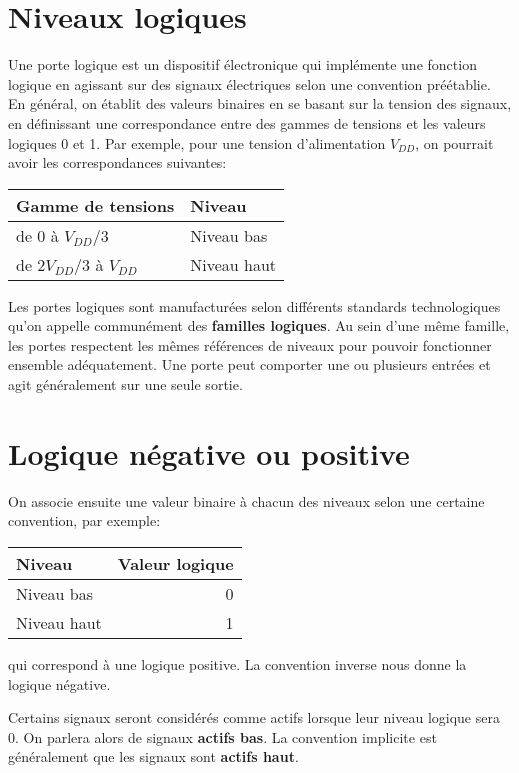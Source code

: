 \documentclass[letter, oneside]{book}
\begin{document}
\section{Niveaux logiques}
\label{sec:org345abae}

Une porte logique est un dispositif électronique qui implémente une
fonction logique en agissant sur des signaux électriques selon une
convention préétablie. En général, on établit des valeurs binaires en
se basant sur la tension des signaux, en définissant une
correspondance entre des gammes de tensions et les valeurs logiques 0
et 1. Par exemple, pour une tension d'alimentation \(V_{DD}\), on
pourrait avoir les correspondances suivantes:

\begin{center}
\begin{tabular}{ll}
Gamme de tensions & Niveau\\[0pt]
\hline
de 0 à  \(V_{DD}/3\) & Niveau bas\\[0pt]
de \(2V_{DD}/3\) à  \(V_{DD}\) & Niveau haut\\[0pt]
\end{tabular}
\end{center}

Les portes logiques sont manufacturées selon différents standards
technologiques qu'on appelle communément des \textbf{familles logiques}. Au
sein d'une même famille, les portes respectent les mêmes références de
niveaux pour pouvoir fonctionner ensemble adéquatement. Une porte peut
comporter une ou plusieurs entrées et agit généralement sur une seule
sortie.

\section{Logique négative ou positive}
\label{sec:org36cb8d4}

On associe ensuite une valeur binaire à chacun des niveaux selon une
certaine convention, par exemple:
\begin{center}
\begin{tabular}{lr}
Niveau & Valeur logique\\[0pt]
\hline
Niveau bas & 0\\[0pt]
Niveau haut & 1\\[0pt]
\end{tabular}
\end{center}
qui correspond à une logique positive. La convention inverse nous
donne la logique négative.

Certains signaux seront considérés comme actifs lorsque leur niveau
logique sera 0. On parlera alors de signaux \textbf{actifs bas}. La
convention implicite est généralement que les signaux sont \textbf{actifs
haut}.
\end{document}
